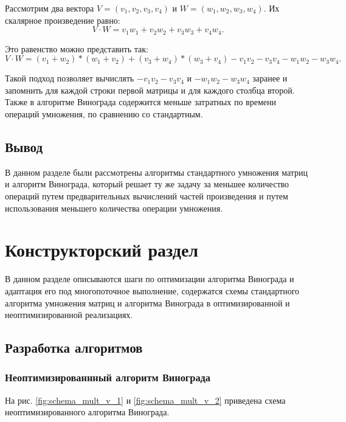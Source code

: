 \documentclass[a4paper,12pt]{article}
\begin{document}
	Рассмотрим два вектора $V = (v_1, v_2, v_3, v_4)$ и $W = (w_1, w_2, w_3, w_4)$. Их скалярное произведение равно:
	\[
	 V \cdot W = v_1w_1 + v_2w_2 + v_3w_3 + v_4w_4.
	\]
	
	Это равенство можно представить так:
	\[
	 V \cdot W = (v_1 + w_2) * (w_1 + v_2) + (v_3 + w_4)*(w_3 + v_4) - v_1v_2 - v_3v_4 - w_1w_2 - w_3w_4.
	 \]	 
	 
	Такой подход позволяет вычислять $ - v_1v_2 - v_3v_4$ и $ - w_1w_2 - w_3w_4$ заранее и запомнить для каждой строки первой матрицы и для каждого столбца второй. Также в алгоритме Винограда содержится меньше затратных по времени операций умножения, по сравнению со стандартным\cite{makkonell}.
	

	    
		\subsection*{Вывод}
		В данном разделе были рассмотрены алгоритмы стандартного умножения матриц и алгоритм Винограда, который решает ту же задачу за меньшее количество операций путем предварительных вычислений частей произведения и путем использования меньшего количества операции умножения. 


\pagebreak


\section{Конструкторский раздел}
	В данном разделе описываются шаги по оптимизации алгоритма Винограда и адаптация его под многопоточное выполнение, содержатся схемы стандартного алгоритма умножения матриц и алгоритма Винограда в оптимизированной и неоптимизированной реализациях.
	
        
    \subsection{Разработка алгоритмов}
    \subsubsection{Неоптимизированнный алгоритм Винограда}
    
        На рис. \ref{fig:schema_mult_v_1} и \ref{fig:schema_mult_v_2} приведена схема неоптимизированного алгоритма Винограда.
        
        
        
\end{document}
